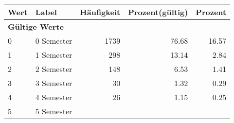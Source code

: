      \begin{longtable}{lXrrr}
     \toprule
     \textbf{Wert} & \textbf{Label} & \textbf{Häufigkeit} & \textbf{Prozent(gültig)} & \textbf{Prozent} \\
     \endhead
     \midrule
     \multicolumn{5}{l}{\textbf{Gültige Werte}}\\

     0 &
     \multicolumn{1}{X}{ 0 Semester   } &


       \num{1739} &
       \num[round-mode=places,round-precision=2]{76.68} &
         \num[round-mode=places,round-precision=2]{16.57} \\

     1 &
     \multicolumn{1}{X}{ 1 Semester   } &


       \num{298} &
       \num[round-mode=places,round-precision=2]{13.14} &
         \num[round-mode=places,round-precision=2]{2.84} \\

     2 &
     \multicolumn{1}{X}{ 2 Semester   } &


       \num{148} &
       \num[round-mode=places,round-precision=2]{6.53} &
         \num[round-mode=places,round-precision=2]{1.41} \\

     3 &
     \multicolumn{1}{X}{ 3 Semester   } &


       \num{30} &
       \num[round-mode=places,round-precision=2]{1.32} &
         \num[round-mode=places,round-precision=2]{0.29} \\

     4 &
     \multicolumn{1}{X}{ 4 Semester   } &


       \num{26} &
       \num[round-mode=places,round-precision=2]{1.15} &
         \num[round-mode=places,round-precision=2]{0.25} \\

     5 &
     \multicolumn{1}{X}{ 5 Semester   } &



\end{longtable}
